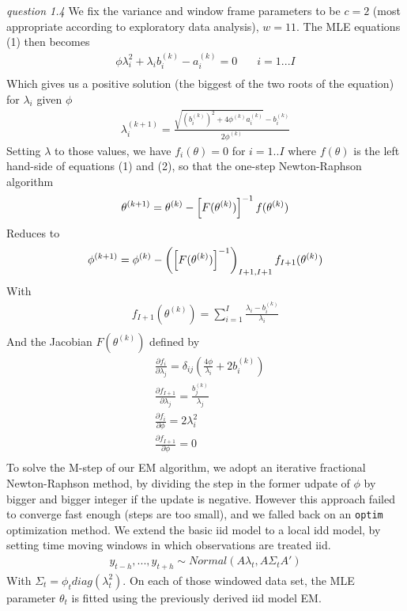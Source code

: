 \documentclass[twoside]{article}
\begin{document}
\textit{question 1.4} We fix the variance and window frame parameters to be $c = 2$ (most appropriate according to exploratory data analysis), $w=11$. The MLE equations (1) then becomes
\begin{align*}
\phi \lambda_i^{2} + \lambda_i b_i^{(k)} - a_i^{(k)} = 0 &  \quad i = 1...I \\
\end{align*}
Which gives us a positive solution (the biggest of the two roots of the equation) for $\lambda_i$ given $\phi$
\begin{align*}
\lambda^{(k + 1)}_i = \frac{\sqrt{(b_i^{(k)})^2 + 4 \phi^{(k)} a_i^{(k)}} - b_i^{(k)}}{2 \phi^{(k)}}
\end{align*}
Setting $\lambda$ to those values, we have $f_i(\theta) = 0$ for $i = 1..I$ where $f(\theta)$ is the left hand-side of equations (1) and (2), so that the one-step Newton-Raphson algorithm
\begin{align*}
\theta^{(k + 1)} = \theta^{(k)} - \left[ F ( \theta^{(k)} ) \right]^{-1} \* f(\theta^{(k)})
\end{align*}
Reduces to
\begin{align*}
\phi^{(k + 1)} = \phi^{(k)} - \left(\left[ F ( \theta^{(k)} ) \right]^{-1}\right)_{I + 1, I + 1} \* f_{I + 1}(\theta^{(k)})
\end{align*}
With
\begin{align*}
f_{I + 1}(\theta^{(k)}) = \sum_{i = 1}^I \frac{\lambda_i - b_i^{(k)}}{\lambda_i}\\
\end{align*}
And the Jacobian $F ( \theta^{(k)})$ defined by
\begin{align*}
& \frac{\partial f_i}{\partial \lambda_j} = \delta_{i j} \left( \frac{4 \phi}{\lambda_i} + 2 b_i^{(k)} \right)\\
& \frac{\partial f_{I + 1}}{\partial \lambda_j} = \frac{b_j^{(k)}}{\lambda_j}\\
& \frac{\partial f_i}{\partial \phi} = 2 \lambda_i^2\\
& \frac{\partial f_{I + 1}}{\partial \phi} = 0\\
\end{align*}
To solve the M-step of our EM algorithm, we adopt an iterative fractional Newton-Raphson method, by dividing the step in the former udpate of $\phi$ by bigger and bigger integer if the update is negative. However this approach failed to converge fast enough (steps are too small), and we falled back on an \texttt{optim} optimization method.
\vspace{.2 in}
We extend the basic iid model to a local idd model, by setting time moving windows in which observations are treated iid.
\begin{align*}
y_{t - h}, ..., y_{t + h} \sim Normal(A \lambda_t, A \Sigma_t A' )
\end{align*}
With $\Sigma_t = \phi_t diag(\lambda_t^2)$. On each of those windowed data set, the MLE parameter $\theta_t$ is fitted using the previously derived iid model EM.
\end{document}
